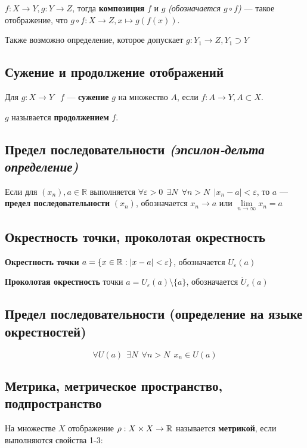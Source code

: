 $f: X\to Y, g: Y\to Z$, тогда \textbf{композиция} $f$ и $g$ \textit{(обозначается $g\circ f$)} --- такое отображение, что $g\circ f: X\to Z, x\mapsto g(f(x))$.


Также возможно определение, которое допускает $g: Y_1\to Z, Y_1\supset Y$

\subsection{Сужение и продолжение отображений}

Для $g: X\to Y\ \ $ $f$ --- \textbf{сужение} $g$ на множество $A$, если $f: A\to Y, A\subset X$.


$g$ называется \textbf{продолжением} $f$.

\subsection{Предел последовательности \textit{(эпсилон-дельта определение)}}

Если для $(x_n), a\in\mathbb{R}$ выполняется
$\forall \varepsilon > 0 \ \ \exists N \ \ \forall n>N \ \ |x_n-a|<\varepsilon$,
то $a$ --- \textbf{предел последовательности} $(x_n)$, обозначается $x_n\to a$ или $\lim\limits_{n\to\infty}x_n=a$

\subsection{Окрестность точки, проколотая окрестность}

\textbf{Окрестность точки} $a = \{x\in\operatorname*{\mathbb{R}}: |x-a|<\varepsilon\}$, обозначается $U_\varepsilon(a)$


\textbf{Проколотая окрестность} точки $a = U_\varepsilon(a)\setminus \{a\}$, обозначается $\dot U_\varepsilon(a)$

\subsection{Предел последовательности (определение на языке окрестностей)}

$$\forall U(a) \ \ \exists N \ \ \forall n>N \ \ x_n\in U(a)$$

\subsection{Метрика, метрическое пространство, подпространство}

На множестве $X$ отображение $\rho: X\times X\to \operatorname*{\mathbb{R}}$ называется \textbf{метрикой}, если выполняются свойства 1-3:

